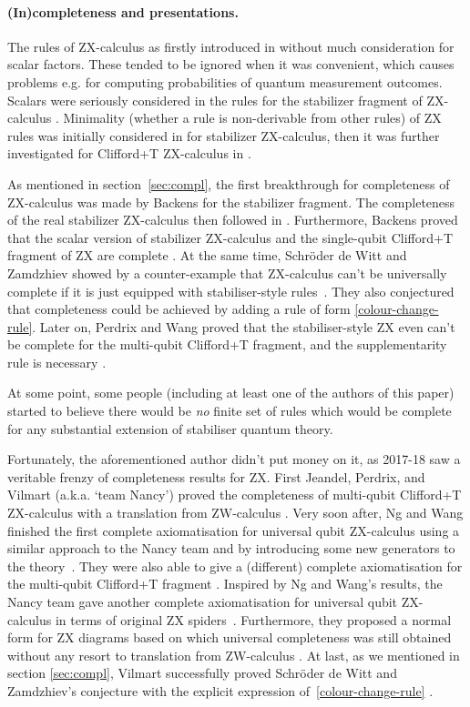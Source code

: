\documentclass[11pt]{article}
\theoremstyle{definition}
\begin{document}
{\paragraph{(In)completeness and presentations.}
The rules of ZX-calculus as firstly introduced in \cite{CD2} without much consideration for scalar factors. These tended to be ignored when it was convenient, which causes problems e.g. for computing probabilities of quantum measurement outcomes. Scalars were seriously considered in the rules for the stabilizer fragment of ZX-calculus \cite{backens_making_2015}.  Minimality (whether a rule is non-derivable from other rules) of ZX rules was initially considered in \cite{bpw2020} for stabilizer ZX-calculus, then it was further investigated for Clifford+T ZX-calculus in \cite{BorunMSc}.

As mentioned in section~\ref{sec:compl}, the first breakthrough for completeness of ZX-calculus was made by Backens \cite{Backens} for the  stabilizer fragment. The completeness of the real stabilizer ZX-calculus then followed in \cite{perdrixpivoting}. Furthermore, Backens proved that the scalar version of stabilizer ZX-calculus and the single-qubit Clifford+T fragment of ZX are complete  \cite{backens_making_2015, Backens2}. At the same time, Schr\"oder de Witt and Zamdzhiev showed by a counter-example that ZX-calculus can't be universally complete if it is just equipped with stabiliser-style rules~\cite{Vladimir}. They also conjectured that completeness could be achieved by adding a rule of form  
\eqref{colour-change-rule}. Later on, Perdrix and Wang proved that the stabiliser-style ZX even can't be complete for the multi-qubit Clifford+T fragment, and the supplementarity rule is necessary \cite{PerdrixWang}.

At some point, some people (including at least one of the authors of this paper) started to believe there would be \textit{no} finite set of rules which would be complete for any substantial extension of stabiliser quantum theory.

Fortunately, the aforementioned author didn't put money on it, as 2017-18 saw a veritable frenzy of completeness results for ZX. First Jeandel, Perdrix, and Vilmart (a.k.a. `team Nancy') proved the completeness of multi-qubit Clifford+T ZX-calculus with a translation from ZW-calculus \cite{jeandel2018complete}. Very soon after, Ng and Wang finished the first complete axiomatisation for universal qubit ZX-calculus using a similar approach to the Nancy team and by introducing some new generators to the theory~\cite{ng2017universal}. They were also able to give a (different) complete axiomatisation for the multi-qubit Clifford+T fragment \cite{ngwang2, hadzihasanovic2018two}. Inspired by Ng and Wang's results, the Nancy team gave another complete axiomatisation for universal qubit ZX-calculus in terms of original ZX spiders~\cite{jeandel2018diagrammatic}. Furthermore, they proposed a normal form for ZX diagrams based on which universal completeness was still obtained without any resort to translation from ZW-calculus \cite{jpvnormalform}. At last, as we mentioned in section \ref{sec:compl}, Vilmart successfully proved Schr\"oder de Witt and Zamdzhiev's conjecture with the explicit expression of~\eqref{colour-change-rule} \cite{vilmart2019near}.


}
\end{document}
